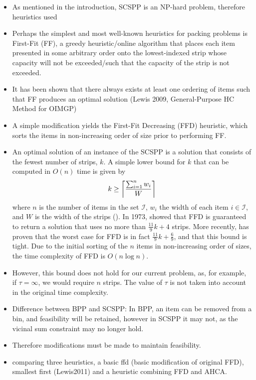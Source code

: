 \documentclass[oribibl]{llncs}
\begin{document}
\begin{itemize}
	\item As mentioned in the introduction, SCSPP is an NP-hard problem, therefore heuristics used
	\item Perhaps the simplest and most well-known heuristics for packing problems is First-Fit (FF), a greedy heuristic/online algorithm that places each item presented in some arbitrary order onto the lowest-indexed strip whose capacity will not be exceeded/such that the capacity of the strip is not exceeded.
	\item It has been shown that there always exists at least one ordering of items such that FF produces an optimal solution (Lewis 2009, General-Purpose HC Method for OIMGP)
	\item A simple modification yields the First-Fit Decreasing (FFD) heuristic, which sorts the items in non-increasing order of size prior to performing FF.
	\item An optimal solution of an instance of the SCSPP is a solution that consists of the fewest number of strips, $k$. A simple lower bound for $k$ that can be computed in $O(n)$ time is given by
	\begin{equation}
	\label{eqn:lowerbound}
	k \geq \ceil*{\frac{\sum_{i=1}^{n}w_i}{W}}
	\end{equation}
	where $n$ is the number of items in the set $\mathcal{I}$, $w_i$ the width of each item $i \in \mathcal{I}$, and $W$ is the width of the strips (\citealp{martello1990b}). In 1973, \citeauthor{johnson1973} showed that FFD is guaranteed to return a solution that uses no more than $\frac{11}{9}k + 4$ strips. More recently, \cite{dosa2007} has proven that the worst case for FFD is in fact $\frac{11}{9}k + \frac{6}{9}$, and that this bound is tight. Due to the initial sorting of the $n$ items in non-increasing order of sizes, the time complexity of FFD is $O(n\log n)$.
	\item However, this bound does not hold for our current problem, as, for example, if $\tau = \infty$, we would require $n$ strips. The value of $\tau$ is not taken into account in the original time complexity.
	\item Difference between BPP and SCSPP: In BPP, an item can be removed from a bin, and feasibility will be retained, however in SCSPP it may not, as the vicinal sum constraint may no longer hold.
	\item Therefore modifications must be made to maintain feasibility.
	\item comparing three heuristics, a basic ffd (basic modification of original FFD), smallest first (Lewis2011) and a heuristic combining FFD and AHCA.

\end{itemize}
\end{document}
